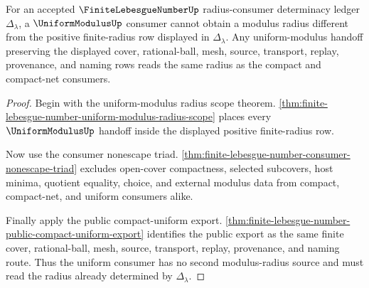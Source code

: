 \begin{theorem}
\label{thm:finite-lebesgue-number-uniform-consumer-determinacy}
For an accepted $\FiniteLebesgueNumberUp$ radius-consumer determinacy ledger $\Delta_{\lambda}$, a $\UniformModulusUp$ consumer cannot obtain a modulus radius different from the positive finite-radius row displayed in $\Delta_{\lambda}$. Any uniform-modulus handoff preserving the displayed cover, rational-ball, mesh, source, transport, replay, provenance, and naming rows reads the same radius as the compact and compact-net consumers.
\end{theorem}
\begin{proof}
Begin with the uniform-modulus radius scope theorem. \autoref{thm:finite-lebesgue-number-uniform-modulus-radius-scope} places every $\UniformModulusUp$ handoff inside the displayed positive finite-radius row.

Now use the consumer nonescape triad. \autoref{thm:finite-lebesgue-number-consumer-nonescape-triad} excludes open-cover compactness, selected subcovers, host minima, quotient equality, choice, and external modulus data from compact, compact-net, and uniform consumers alike.

Finally apply the public compact-uniform export. \autoref{thm:finite-lebesgue-number-public-compact-uniform-export} identifies the public export as the same finite cover, rational-ball, mesh, source, transport, replay, provenance, and naming route. Thus the uniform consumer has no second modulus-radius source and must read the radius already determined by $\Delta_{\lambda}$.
\end{proof}

